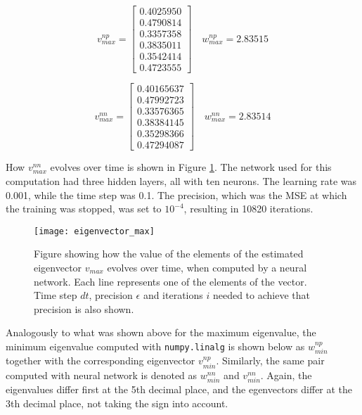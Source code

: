 \begin{equation*}
v_{max}^{np} = \begin{bmatrix}
	0.4025950 \\
	0.4790814 \\
	0.3357358 \\
    0.3835011 \\
    0.3542414 \\
    0.4723555
\end{bmatrix} \quad w_{max}^{np} =  2.83515
\end{equation*}

\begin{equation*}
v_{max}^{nn} = \begin{bmatrix}
	0.40165637 \\
	0.47992723 \\
	0.33576365 \\
	0.38384145 \\
	0.35298366 \\
	0.47294087
\end{bmatrix} \quad w_{max}^{nn} = 2.83514
\end{equation*}

How $v_{max}^{nn}$ evolves over time is shown in Figure \ref{fig:eigenvector_max}. The network used for this computation had three hidden layers, all with ten neurons. The learning rate was 0.001, while the time step was 0.1. The precision, which was the MSE at which the training was stopped, was set to $10^{-4}$, resulting in 10820 iterations. 

 \begin{figure}[htbp]
 	\centering
 	\texttt{[image: eigenvector\_max]}
 	\caption{Figure showing how the value of the elements of the estimated eigenvector $v_{max}$ evolves over time, when computed by a neural network. Each line represents one of the elements of the vector. Time step $dt$, precision $\epsilon$ and iterations $i$ needed to achieve that precision is also shown.}
 	\label{fig:eigenvector_max}
 \end{figure}
 
 Analogously to what was shown above for the maximum eigenvalue, the minimum eigenvalue computed with \texttt{numpy.linalg} is shown below as $w_{min}^{np}$ together with the corresponding eigenvector $v_{min}^{np}$. Similarly, the same pair computed with neural network is denoted as $w_{min}^{nn}$ and $v_{min}^{nn}$. Again, the eigenvalues differ first at the 5th decimal place, and the egenvectors differ at the 3th decimal place, not taking the sign into account. 

